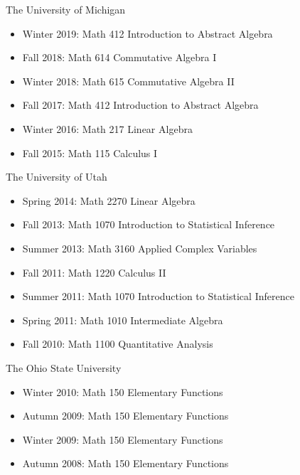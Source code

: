 \documentclass[12pt]{amsart}
\begin{document}
\hspace{-5mm} The University of Michigan
\begin{itemize}	[leftmargin=9mm]
	\item Winter 2019: Math 412 Introduction to Abstract Algebra
	\item Fall 2018: Math 614 Commutative Algebra I
	\item Winter 2018: Math 615 Commutative Algebra II
	\item Fall 2017: Math 412 Introduction to Abstract Algebra
	\item Winter 2016: Math 217 Linear Algebra
	\item Fall 2015: Math 115 Calculus I
\end{itemize}

\hspace{-5mm} The University of Utah
\begin{itemize}[leftmargin=9mm]
\item Spring 2014: Math 2270 Linear Algebra
\item Fall 2013: Math 1070 Introduction to Statistical Inference
\item Summer 2013: Math 3160 Applied Complex Variables
\item Fall 2011: Math 1220 Calculus II
\item Summer 2011: Math 1070 Introduction to Statistical Inference
\item Spring 2011: Math 1010 Intermediate Algebra
\item Fall 2010: Math 1100 Quantitative Analysis
\end{itemize}


\hspace{-5mm} The Ohio State University
\begin{itemize}[leftmargin=9mm]
\item Winter 2010: Math 150 Elementary Functions
\item Autumn 2009: Math 150 Elementary Functions
\item Winter 2009: Math 150 Elementary Functions
\item Autumn 2008: Math 150 Elementary Functions
\end{itemize}
 
\end{document}
